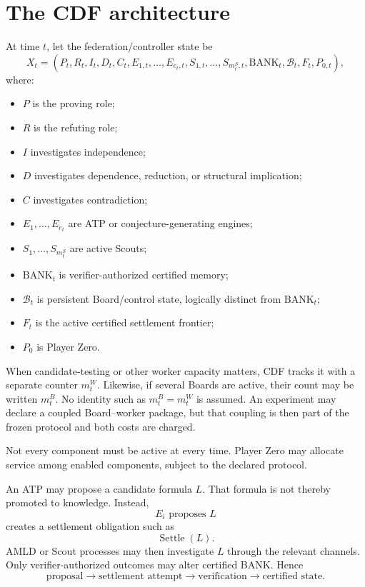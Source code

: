 \documentclass[11pt]{article}
\theoremstyle{definition}
\newcommand{\BANK}{\mathrm{BANK}}
\newcommand{\Board}{\mathcal{B}}
\begin{document}
\section{The CDF architecture}

At time $t$, let the federation/controller state be
\[
X_t=(P_t,R_t,I_t,D_t,C_t,E_{1,t},\ldots,E_{e_t,t},S_{1,t},\ldots,S_{m_t^{S},t},\BANK_t,\Board_t,F_t,P_{0,t}),
\]
where:
\begin{itemize}
\item $P$ is the proving role;
\item $R$ is the refuting role;
\item $I$ investigates independence;
\item $D$ investigates dependence, reduction, or structural implication;
\item $C$ investigates contradiction;
\item $E_1,\ldots,E_{e_t}$ are ATP or conjecture-generating engines;
\item $S_1,\ldots,S_{m_t^{S}}$ are active Scouts;
\item $\BANK_t$ is verifier-authorized certified memory;
\item $\Board_t$ is persistent Board/control state, logically distinct from $\BANK_t$;
\item $F_t$ is the active certified settlement frontier;
\item $P_0$ is Player Zero.
\end{itemize}
When candidate-testing or other worker capacity matters, CDF tracks it with a separate counter $m_t^{W}$. Likewise, if several Boards are active, their count may be written $m_t^{B}$. No identity such as $m_t^{B}=m_t^{W}$ is assumed. An experiment may declare a coupled Board--worker package, but that coupling is then part of the frozen protocol and both costs are charged.

Not every component must be active at every time. Player Zero may allocate service among enabled components, subject to the declared protocol.

An ATP may propose a candidate formula $L$. That formula is not thereby promoted to knowledge. Instead,
\[
E_i\text{ proposes }L
\]
creates a settlement obligation such as
\[
\operatorname{Settle}(L).
\]
AMLD or Scout processes may then investigate $L$ through the relevant channels. Only verifier-authorized outcomes may alter certified BANK. Hence
\[
\boxed{\text{proposal}\to\text{settlement attempt}\to\text{verification}\to\text{certified state}.}
\]
\end{document}
